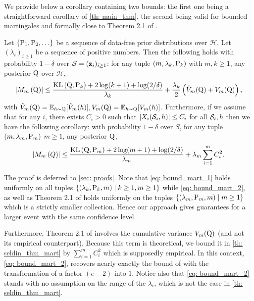We provide below a corollary containing two bounds: the first one being a straightforward corollary of \cref{th: main_thm}, the second being valid for bounded martingales and formally close to Theorem 2.1 of \citet{seldin2012bandit}.
\begin{corollary}
\label{cor: bound_mart}
Let $\left\{\P_1, \P_2, \ldots\right\}$ be a sequence of data-free prior distributions over $\mathcal{H}$. Let $(\lambda_i)_{i\geq 1}$ be a sequence of positive numbers.
Then the following holds with probability $1-\delta$ over $\S=(\z_i)_{i\geq 1}$: for any tuple $(m,\lambda_k,\P_k)$ with $m,k\geq 1$, any posterior $\Q$ over $\mathcal{H}$,
\begin{align}
\label{eq: bound_mart_1}
\left|M_m\left(\Q\right)\right| \leq \frac{\KL\left(\Q, \P_k\right)+2 \log (k+1)+\log (2/\delta)}{\lambda_k}+ \frac{\lambda_k}{2}\left( \hat{V}_m(\Q) + V_m(\Q) \right),
\end{align}
with $\hat{V}_m(\Q)= \mathbb{E}_{h\sim \Q}[\hat{V}_m(h)], V_m(\Q)= \mathbb{E}_{h\sim \Q}[V_m(h)]$.
Furthermore, if we assume that for any $i$, there exists $C_i>0$ such that $|X_i(\S_i,h)|\leq C_i$ for all $\S_i,h$ then we have the following corollary: with probability $1-\delta$ over $S$, for any tuple $(m,\lambda_m,\P_m)$ $m\geq 1$, any posterior $\Q$,
\begin{align}
\label{eq: bound_mart_2}
\left|M_m\left(Q\right)\right| \leq \frac{\KL\left(\Q, \P_m\right)+2 \log (m+1)+\log (2/\delta)}{\lambda_m}+ \lambda_m\sum_{i=1}^m C_i^2.
\end{align}
\end{corollary}
The proof is deferred to \cref{sec: proofs}.
Note that \cref{eq: bound_mart_1} holds uniformly on all tuples $\{(\lambda_k,\P_k,m) \mid k\geq 1, m\geq 1\}$ while \cref{eq: bound_mart_2}, as well as Theorem 2.1 of \citet{seldin2012bandit} holds uniformly on the tuples
$\{(\lambda_m,\P_m,m) \mid m\geq 1\}$ which is a strictly smaller collection. Hence our approach gives guarantees for a larger event with the same confidence level.

Furthermore, Theorem 2.1 of \citet{seldin2012bandit} involves the cumulative variance $V_m(\Q)$ (and not its empirical counterpart). Because this term is theoretical, we bound it in \cref{th: seldin_thm_mart} by $\sum_{i=1}^m C_i^2$ which is supposedly empirical.
In this context, \cref{eq: bound_mart_2}, recovers nearly exactly the bound of \cite{seldin2012bandit} with the transformation of a factor $(e-2)$ into $1$.
Notice also that \cref{eq: bound_mart_2} stands with no assumption on the range of the $\lambda_i$, which is not the case in \cref{th: seldin_thm_mart}.

